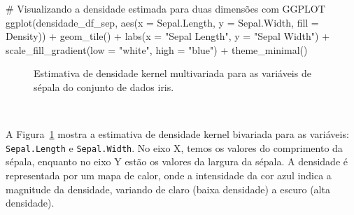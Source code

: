 \documentclass[
  a4paperpaper,
]{article}
\newenvironment{Shaded}{\begin{snugshade}}{\end{snugshade}}
\newcommand{\AttributeTok}[1]{\textcolor[rgb]{0.40,0.45,0.13}{#1}}
\newcommand{\CommentTok}[1]{\textcolor[rgb]{0.37,0.37,0.37}{#1}}
\newcommand{\FunctionTok}[1]{\textcolor[rgb]{0.28,0.35,0.67}{#1}}
\newcommand{\NormalTok}[1]{\textcolor[rgb]{0.00,0.23,0.31}{#1}}
\newcommand{\SpecialCharTok}[1]{\textcolor[rgb]{0.37,0.37,0.37}{#1}}
\newcommand{\StringTok}[1]{\textcolor[rgb]{0.13,0.47,0.30}{#1}}
\begin{document}
\begin{Shaded}
\begin{Highlighting}[]
\CommentTok{\# Visualizando a densidade estimada para duas dimensões com GGPLOT}
\FunctionTok{ggplot}\NormalTok{(densidade\_df\_sep, }\FunctionTok{aes}\NormalTok{(}\AttributeTok{x =}\NormalTok{ Sepal.Length, }\AttributeTok{y =}\NormalTok{ Sepal.Width, }\AttributeTok{fill =}\NormalTok{ Density)) }\SpecialCharTok{+}
  \FunctionTok{geom\_tile}\NormalTok{() }\SpecialCharTok{+}
  \FunctionTok{labs}\NormalTok{(}\AttributeTok{x =} \StringTok{"Sepal Length"}\NormalTok{,}
       \AttributeTok{y =} \StringTok{"Sepal Width"}\NormalTok{) }\SpecialCharTok{+}
  \FunctionTok{scale\_fill\_gradient}\NormalTok{(}\AttributeTok{low =} \StringTok{"white"}\NormalTok{, }\AttributeTok{high =} \StringTok{"blue"}\NormalTok{) }\SpecialCharTok{+}
  \FunctionTok{theme\_minimal}\NormalTok{()}
\end{Highlighting}
\end{Shaded}

\begin{figure}[H]


\caption{\label{fig-densidadeiris2}Estimativa de densidade kernel
multivariada para as variáveis de sépala do conjunto de dados iris.}

\end{figure}%

~

A Figura~\ref{fig-densidadeiris2} mostra a estimativa de densidade
kernel bivariada para as variáveis: \texttt{Sepal.Length} e
\texttt{Sepal.Width}. No eixo X, temos os valores do comprimento da
sépala, enquanto no eixo Y estão os valores da largura da sépala. A
densidade é representada por um mapa de calor, onde a intensidade da cor
azul indica a magnitude da densidade, variando de claro (baixa
densidade) a escuro (alta densidade).
\end{document}
